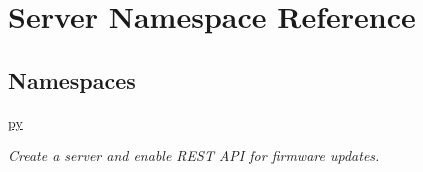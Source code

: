 \hypertarget{namespaceServer}{}\section{Server Namespace Reference}
\label{namespaceServer}
\subsection*{Namespaces}
\begin{DoxyCompactItemize}
\item 
 \hyperlink{namespaceServer_1_1py}{py}
\begin{DoxyCompactList}\small\item\em Create a server and enable R\+E\+ST A\+PI for firmware updates. \end{DoxyCompactList}\end{DoxyCompactItemize}
